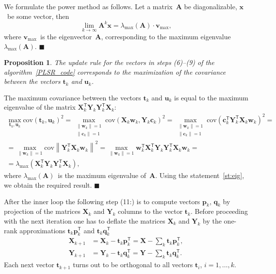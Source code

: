 \documentclass[12pt,oneside]{article}
\newtheorem{proposition}{Proposition}
\theoremstyle{definition}
\newcommand{\bx}{\mathbf{x}}
\newcommand{\bw}{\mathbf{w}}
\newcommand{\bY}{\mathbf{Y}}
\newcommand{\bX}{\mathbf{X}}
\newcommand{\bu}{\mathbf{u}}
\newcommand{\bt}{\mathbf{t}}
\newcommand{\bp}{\mathbf{p}}
\newcommand{\bq}{\mathbf{q}}
\newcommand{\bc}{\mathbf{c}}
\newcommand{\T}{\mathsf{T}}
\begin{document}
We formulate the power method as follows. Let a matrix~$\mathbf{A}$ be diagonalizable, $\bx$~be some vector, then
\begin{equation}
\lim_{k \rightarrow \infty} \mathbf{A}^k \bx = \lambda_{\max}(\mathbf{A}) \cdot \mathbf{v}_{\max},
\end{equation}
where $\mathbf{v}_{\max}$~is the eigenvector~$\mathbf{A}$, corresponding to the maximum eigenvalue~$ \lambda_{\max} (\mathbf{A})$.
$\blacksquare$

\begin{proposition}
	The update rule for the vectors in steps (6)--(9) of the algorithm~\ref{PLSR_code} corresponds to the maximization of the covariance between the vectors $\bt_k$ and $\bu_k$.
\end{proposition}

The maximum covariance between the vectors $\bt_k$ and $\bu_k$ is equal to the maximum eigenvalue of the matrix $\bX_k^{\T} \bY_k \bY_k^{\T} \bX_k$:
\begin{multline}
\max_{\bt_k, \bu_k}  \text{cov} (\bt_k, \bu_k)^2 = \max_{\substack{\|\bw_k\|=1 \\ \|\bc_k\| = 1}} \text{cov} \left( \bX_k \bw_k, \bY_k \bc_k \right)^2 = \max_{\substack{\|\bw_k\|=1 \\ \|\bc_k\| = 1}} \text{cov} \left(\bc_k^{\T}  \bY_k^{\T} \bX_k \bw_k \right)^2 = \\
= \max_{\|\bw_k\| = 1} \text{cov} \left\|\bY_k^{\T} \bX_k \bw_k \right\|^2 = \max_{\|\bw_k\| = 1} \bw_k^{\T} \bX_k^{\T} \bY_k \bY_k^{\T} \bX_k \bw_k = \\
 = \lambda_{\max} \left( \bX_k^{\T} \bY_k \bY_k^{\T} \bX_k \right),
\end{multline}
where $ \lambda_{\max} (\mathbf{A})$~is the maximum eigenvalue of~$\mathbf{A}$.
Using the statement~\ref{st:eig}, we obtain the required result.
$\blacksquare$

After the inner loop the following step (11:) is to compute vectors $\bp_k$, $\bq_k$ by projection of the matrices $\bX_k$ and $\bY_k$ columns to the vector $\bt_k$. 
Before proceeding with the next iteration one has to deflate the matrices $\bX_k$ and $\bY_k$ by the one-rank approximations $\bt_k \bp_k^{\T}$ and $\bt_k \bq_k^{\T}$
\begin{align}
\bX_{k + 1} &= \bX_{k} - \bt_k \bp_k^{\T} = \bX - \sum_k \bt_k \bp_k^{\T}, 
\label{eq:deviation_X} \\
\bY_{k + 1} &= \bY_{k} - \bt_k \bq_k^{\T} = \bY - \sum_k \bt_k \bq_k^{\T}.
\label{eq:deviation_Y}
\end{align}
Each next vector $\bt_{k+1}$ turns out to be orthogonal to all vectors $\bt_i$, $i=1, \dots, k$.
\end{document}
